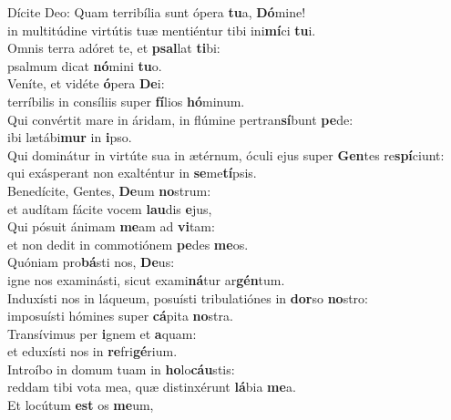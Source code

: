 \evenverse Dícite Deo: Quam terribília sunt ópera \textbf{tu}a, \textbf{Dó}mine!~\*\\
\evenverse in multitúdine virtútis tuæ mentiéntur tibi ini\textbf{mí}ci \textbf{tu}i.\\
\oddverse Omnis terra adóret te, et \textbf{psal}lat \textbf{ti}bi:~\*\\
\oddverse psalmum dicat \textbf{nó}mini \textbf{tu}o.\\
\evenverse Veníte, et vidéte \textbf{ó}pera \textbf{De}i:~\*\\
\evenverse terríbilis in consíliis super \textbf{fí}lios \textbf{hó}minum.\\
\oddverse Qui convértit mare in áridam, in flúmine pertran\textbf{sí}bunt \textbf{pe}de:~\*\\
\oddverse ibi lætábi\textbf{mur} in \textbf{i}pso.\\
\evenverse Qui dominátur in virtúte sua in ætérnum, óculi ejus super \textbf{Gen}tes re\textbf{spí}ciunt:~\*\\
\evenverse qui exásperant non exalténtur in \textbf{se}me\textbf{tí}psis.\\
\oddverse Benedícite, Gentes, \textbf{De}um \textbf{no}strum:~\*\\
\oddverse et audítam fácite vocem \textbf{lau}dis \textbf{e}jus,\\
\evenverse Qui pósuit ánimam \textbf{me}am ad \textbf{vi}tam:~\*\\
\evenverse et non dedit in commotiónem \textbf{pe}des \textbf{me}os.\\
\oddverse Quóniam pro\textbf{bá}sti nos, \textbf{De}us:~\*\\
\oddverse igne nos examinásti, sicut exami\textbf{ná}tur ar\textbf{gén}tum.\\
\evenverse Induxísti nos in láqueum, posuísti tribulatiónes in \textbf{dor}so \textbf{no}stro:~\*\\
\evenverse imposuísti hómines super \textbf{cá}pita \textbf{no}stra.\\
\oddverse Transívimus per \textbf{i}gnem et \textbf{a}quam:~\*\\
\oddverse et eduxísti nos in \textbf{re}fri\textbf{gé}rium.\\
\evenverse Introíbo in domum tuam in \textbf{ho}lo\textbf{cáu}stis:~\*\\
\evenverse reddam tibi vota mea, quæ distinxérunt \textbf{lá}bia \textbf{me}a.\\
\oddverse Et locútum \textbf{est} os \textbf{me}um,~\*\\
